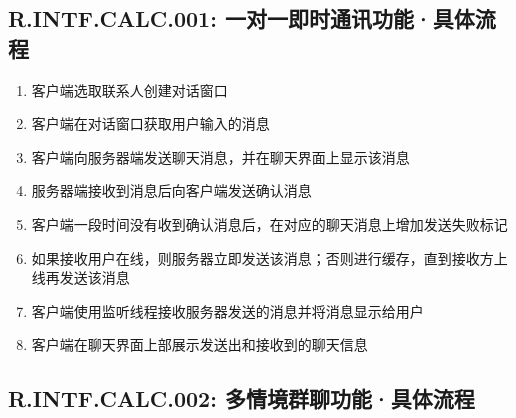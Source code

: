     \subsection{R.INTF.CALC.001: 一对一即时通讯功能·具体流程}
        \begin{enumerate}
            \item 客户端选取联系人创建对话窗口
            \item 客户端在对话窗口获取用户输入的消息
            \item 客户端向服务器端发送聊天消息，并在聊天界面上显示该消息
            \item 服务器端接收到消息后向客户端发送确认消息
            \item 客户端一段时间没有收到确认消息后，在对应的聊天消息上增加发送失败标记
            \item 如果接收用户在线，则服务器立即发送该消息；否则进行缓存，直到接收方上线再发送该消息
            \item 客户端使用监听线程接收服务器发送的消息并将消息显示给用户
            \item 客户端在聊天界面上部展示发送出和接收到的聊天信息
        \end{enumerate}
    \subsection{R.INTF.CALC.002: 多情境群聊功能·具体流程}
